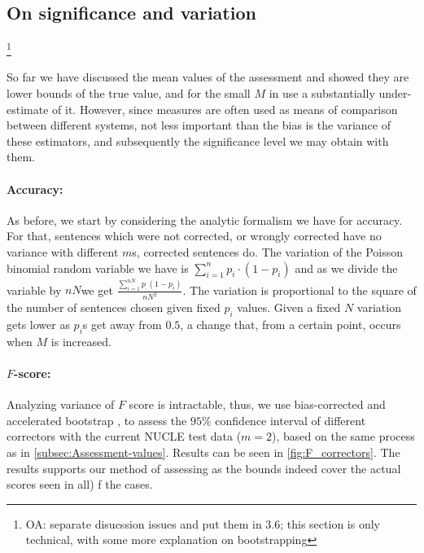 \documentclass[letter,11pt]{article}
\newcommand{\oa}[1]{\footnote{\color{red}OA: #1}}
\begin{document}
\subsection{On significance and variation}

\oa{separate disucssion issues and put them in 3.6; this section is only
  technical, with some more explanation on bootstrapping}


So far we have discussed the mean values of the assessment and showed they are lower bounds of the true value, and for the small $M$ in use a substantially under-estimate of it. However, since measures are often used as means of comparison between different systems, not less important than the bias is the variance of these estimators, and subsequently the significance level we may obtain with them. 

\begin{figure}
   	\texttt{[image: \$F\_\{0.5]}$_Ms_significance}
	\caption{F Score results with different sizes of gold standard.\label{fig:F_Ms}}
\end{figure}
\begin{figure}
   	\texttt{[image: \$F\_\{0.5]}$_significance}
	\caption{F Score results for different correctors including confidence interval.\label{fig:F_correctors}}
\end{figure}


\paragraph{Accuracy:} As before, we start by considering the analytic formalism we have for accuracy. For that, sentences which were not corrected, or wrongly corrected have no variance with different $m$s, corrected sentences do. The variation of the Poisson binomial random variable we have is $\sum_{i=1}^{n}p_i\cdot\left(1-p_i\right)$ and as we divide the variable by $nN$we get $\frac{\sum_{i=1}^{nN}p_\cdot\left(1-p_i\right)}{nN^2}$.
The variation is proportional to the square of the number of sentences chosen given fixed $p_i$ values. Given a fixed $N$ variation gets lower as $p_i$s get away from $0.5$, a change that, from a certain point, occurs when $M$ is increased.

\paragraph{$F$-score:} Analyzing variance of $F$ score is intractable\cite{yeh2000more}, thus, we use bias-corrected and accelerated bootstrap \cite{efron1987better}, to assess the $95\%$ confidence interval of different correctors with the current NUCLE test data ($m=2$), based on the same process as in \ref{subsec:Assessment-values}. Results can be seen in \ref{fig:F_correctors}. The results supports our method of assessing as the bounds indeed cover the actual scores seen in all) f the cases.
\end{document}
